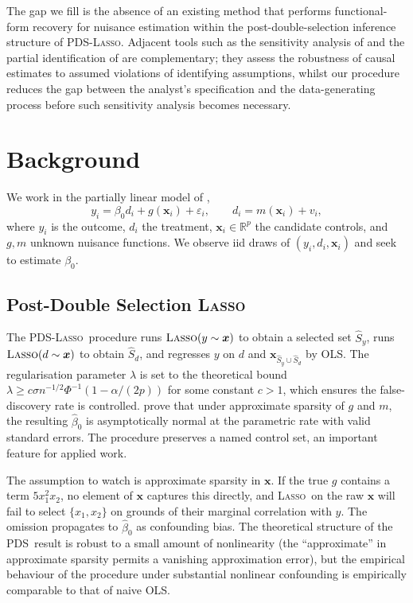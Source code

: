 \documentclass[11pt, a4paper]{article}
\theoremstyle{plain}
\theoremstyle{definition}
\theoremstyle{remark}
\newcommand{\lasso}{\textsc{Lasso}}
\newcommand{\pds}{\textsc{PDS}}
\newcommand{\R}{\mathbb{R}}
\newcommand{\Shat}{\hat{S}}
\newcommand{\betahat}{\hat{\beta}_0}
\begin{document}
The gap we fill is the absence of an existing method that
performs functional-form recovery for nuisance estimation within
the post-double-selection inference structure of \pds-\lasso.
Adjacent tools such as the sensitivity analysis of
\citet{cinelli2020sensitivity} and the partial identification
of \citet{conley2012plausibly} are complementary; they assess
the robustness of causal estimates to assumed violations of
identifying assumptions, whilst our procedure reduces the gap
between the analyst's specification and the data-generating
process before such sensitivity analysis becomes necessary.

\section{Background}
\label{sec:background}

We work in the partially linear model of \citet{robinson1988},
\begin{equation}
    y_i = \beta_0 d_i + g(\bm{x}_i) + \varepsilon_i, \qquad
    d_i = m(\bm{x}_i) + v_i,
    \label{eq:plm}
\end{equation}
where $y_i$ is the outcome, $d_i$ the treatment, $\bm{x}_i \in
\R^p$ the candidate controls, and $g, m$ unknown nuisance
functions. We observe iid draws of $(y_i, d_i, \bm{x}_i)$ and
seek to estimate $\beta_0$.

\subsection{Post-Double Selection \lasso}

The \pds-\lasso\ procedure runs $\lasso(y \sim \bm{x})$ to obtain
a selected set $\Shat_y$, runs $\lasso(d \sim \bm{x})$ to obtain
$\Shat_d$, and regresses $y$ on $d$ and $\bm{x}_{\Shat_y \cup
\Shat_d}$ by OLS. The regularisation parameter $\lambda$ is set
to the theoretical bound $\lambda \geq c \sigma n^{-1/2}
\Phi^{-1}(1 - \alpha/(2p))$ for some constant $c > 1$, which
ensures the false-discovery rate is controlled. \citet{bch2014}
prove that under approximate sparsity of $g$ and $m$, the
resulting $\betahat$ is asymptotically normal at the parametric
rate with valid standard errors. The procedure preserves a named
control set, an important feature for applied work.

The assumption to watch is approximate sparsity in $\bm{x}$. If
the true $g$ contains a term $5 x_1^2 x_2$, no element of
$\bm{x}$ captures this directly, and \lasso\ on the raw $\bm{x}$
will fail to select $\{x_1, x_2\}$ on grounds of their marginal
correlation with $y$. The omission propagates to $\betahat$ as
confounding bias. The theoretical structure of the \pds\ result
is robust to a small amount of nonlinearity (the ``approximate''
in approximate sparsity permits a vanishing approximation error),
but the empirical behaviour of the procedure under substantial
nonlinear confounding is empirically comparable to that of
naive OLS.
\end{document}
